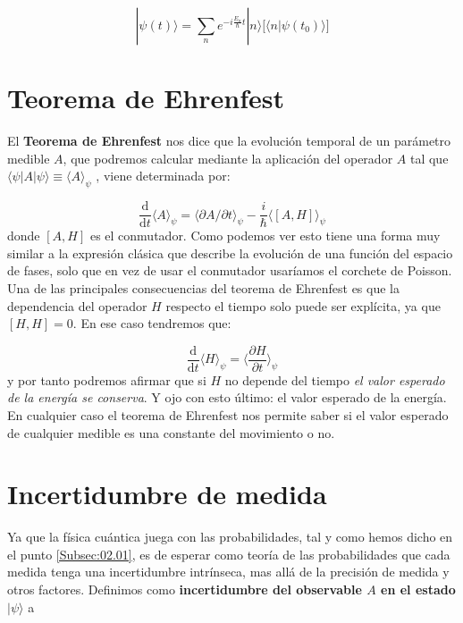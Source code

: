 \documentclass[12pt]{book}
\numberwithin{equation}{chapter}
\numberwithin{figure}{chapter}
\newcommand{\parciales}[2]{\frac{\partial #1}{\partial #2}}
\newcommand{\D}{\mathrm{d}}
\newcommand{\derivadas}[2]{\frac{\D #1}{\D #2}}
\begin{document}
\begin{equation}
| \psi (t) \rangle =  \sum_n  e^{-i \frac{E_n}{\hbar} t } | n \rangle \Big[ \langle n | \psi (t_0) \rangle \Big]
\end{equation}


\section{Teorema de Ehrenfest}

El \textbf{Teorema de Ehrenfest} nos dice que la evolución temporal de un parámetro medible $A$, que podremos calcular mediante la aplicación del operador $A$ tal que $\langle \psi | A | \psi \rangle \equiv \langle A \rangle_\psi$ , viene determinada por:

\begin{equation}
\derivadas{}{t} \langle A \rangle_\psi = \langle \partial A / \partial t \rangle_\psi - \frac{i}{\hbar} \langle [A,H] \rangle_\psi \label{Ec:02.03-01}
\end{equation}
donde $[A,H]$ es el conmutador. Como podemos ver esto tiene una forma muy similar a la expresión clásica que describe la evolución de una función del espacio de fases, solo que en vez de usar el conmutador usaríamos el corchete de Poisson. Una de las principales consecuencias del teorema de Ehrenfest es que la dependencia del operador $H$ respecto el tiempo solo puede ser explícita, ya que $[H,H] = 0$. En ese caso tendremos que:

\begin{equation}
\derivadas{}{t} \langle H \rangle_\psi = \langle \parciales{H}{t} \rangle_\psi
\end{equation}
y por tanto podremos afirmar que si $H$ no depende del tiempo \textit{el valor esperado de la energía se conserva}. Y ojo con esto último: el valor esperado de la energía. En cualquier caso el teorema de Ehrenfest nos permite saber si el valor esperado de cualquier medible es una constante del movimiento o no.

\section{Incertidumbre de medida}

Ya que la física cuántica juega con las probabilidades, tal y como hemos dicho en el punto \ref{Subsec:02.01}, es de esperar como teoría de las probabilidades que cada medida tenga una incertidumbre intrínseca, mas allá de la precisión de medida y otros factores. Definimos como \textbf{incertidumbre del observable $A$ en el estado} $|\psi\rangle$ a
\end{document}
